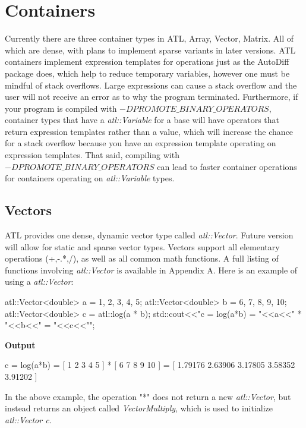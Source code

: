 \documentclass[12pt,a4paper]{article}
\begin{document}
\section{Containers}
Currently there are three container types in ATL, Array, Vector, Matrix. All of which are dense, with plans to implement sparse variants in later versions. ATL containers implement expression templates for operations just as the AutoDiff package does, which help to reduce temporary variables, however one must be mindful of stack overflows. Large expressions can cause a stack overflow and the user will not receive an error as to why the program terminated. Furthermore, if your program is compiled with \textit{$-DPROMOTE\_BINARY\_OPERATORS$}, container types that have a \textit{atl::Variable} for a base will have operators that return expression templates rather than a value, which will increase the chance for a stack overflow because you have an expression template operating on expression templates. That said, compiling with \textit{$-DPROMOTE\_BINARY\_OPERATORS$} can lead to faster container operations for containers operating on \textit{atl::Variable} types.
\subsection{Vectors}
ATL provides one dense, dynamic vector type called \textit{atl::Vector}. Future version will allow for static and sparse vector types. Vectors support all elementary operations (+,-.*,/), as well as all common math functions. A full listing of functions involving \textit{atl::Vector} is available in Appendix A. Here is an example of using a \textit{atl::Vector}:
\begin{cppsource}

    atl::Vector<double> a = {1, 2, 3, 4, 5};
    atl::Vector<double> b = {6, 7, 8, 9, 10};
    atl::Vector<double> c = atl::log(a * b);
    std::cout<<"c = log(a*b) = "<<a<<" * "<<b<<" = "<<c<<"\n";
  
\end{cppsource}
\textbf{Output}
\begin{myoutput}
c = log(a*b) = [ 1 2 3 4 5 ] * [ 6 7 8 9 10 ] = [ 1.79176 2.63906 3.17805 3.58352 3.91202 ]
\end{myoutput}
In the above example, the operation "*" does not return a new \textit{atl::Vector}, but instead returns an object called \textit{VectorMultiply}, which is used to initialize \textit{atl::Vector c}.
\end{document}
